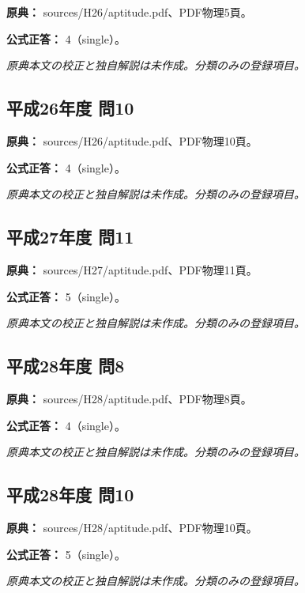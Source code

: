 \noindent\textbf{原典：} sources/H26/aptitude.pdf、PDF物理5頁。

\textbf{公式正答：} 4（single）。

\par\textit{原典本文の校正と独自解説は未作成。分類のみの登録項目。}

\subsection{平成26年度 問10}
\label{q:h26-reg-apt-10}

\noindent\textbf{原典：} sources/H26/aptitude.pdf、PDF物理10頁。

\textbf{公式正答：} 4（single）。

\par\textit{原典本文の校正と独自解説は未作成。分類のみの登録項目。}

\subsection{平成27年度 問11}
\label{q:h27-reg-apt-11}

\noindent\textbf{原典：} sources/H27/aptitude.pdf、PDF物理11頁。

\textbf{公式正答：} 5（single）。

\par\textit{原典本文の校正と独自解説は未作成。分類のみの登録項目。}

\subsection{平成28年度 問8}
\label{q:h28-reg-apt-08}

\noindent\textbf{原典：} sources/H28/aptitude.pdf、PDF物理8頁。

\textbf{公式正答：} 4（single）。

\par\textit{原典本文の校正と独自解説は未作成。分類のみの登録項目。}

\subsection{平成28年度 問10}
\label{q:h28-reg-apt-10}

\noindent\textbf{原典：} sources/H28/aptitude.pdf、PDF物理10頁。

\textbf{公式正答：} 5（single）。

\par\textit{原典本文の校正と独自解説は未作成。分類のみの登録項目。}

